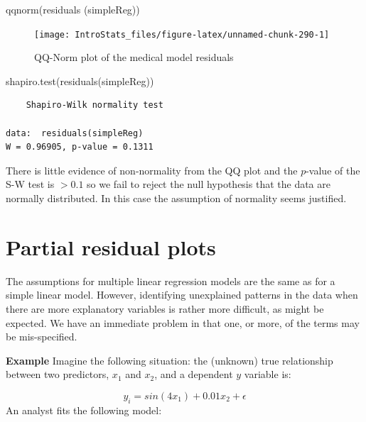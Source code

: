 \documentclass[
  oneside]{krantz}
\newenvironment{Shaded}{\begin{snugshade}}{\end{snugshade}}
\newcommand{\FunctionTok}[1]{\textcolor[rgb]{0.00,0.00,0.00}{#1}}
\newcommand{\NormalTok}[1]{#1}
\begin{document}
\begin{Shaded}
\begin{Highlighting}[]
 \FunctionTok{qqnorm}\NormalTok{(}\FunctionTok{residuals}\NormalTok{ (simpleReg))}
\end{Highlighting}
\end{Shaded}

\begin{figure}

{\centering \texttt{[image: IntroStats\_files/figure-latex/unnamed-chunk-290-1]} 

}

\caption{QQ-Norm plot of the medical model residuals}\label{fig:unnamed-chunk-290}
\end{figure}

\begin{Shaded}
\begin{Highlighting}[]
\FunctionTok{shapiro.test}\NormalTok{(}\FunctionTok{residuals}\NormalTok{(simpleReg))}
\end{Highlighting}
\end{Shaded}

\begin{verbatim}
    Shapiro-Wilk normality test

data:  residuals(simpleReg)
W = 0.96905, p-value = 0.1311
\end{verbatim}

There is little evidence of non-normality from the QQ plot and the \(p\)-value of the S-W test is \(>0.1\) so we fail to reject the null hypothesis that the data are normally distributed. In this case the assumption of normality seems justified.

\hypertarget{partial-residual-plots}{%
\section{Partial residual plots}\label{partial-residual-plots}}

The assumptions for multiple linear regression models are the same as for a simple linear model. However, identifying unexplained patterns in the data when there are more explanatory variables is rather more difficult, as might be expected. We have an immediate problem in that one, or more, of the terms may be mis-specified.

\textbf{Example} Imagine the following situation: the (unknown) true relationship between two predictors, \(x_1\) and \(x_2\), and a dependent \(y\) variable is:

\[y_i= sin (4x_1)+0.01x_2+\epsilon\]
An analyst fits the following model:
\end{document}
